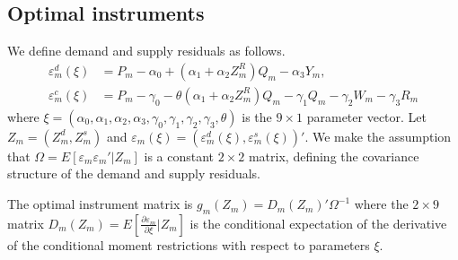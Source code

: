 \documentclass[11pt, a4paper]{article}
\begin{document}
\subsection{Optimal instruments}
We define demand and supply residuals as follows.
\begin{align*}
    \varepsilon^{d}_{m}(\xi) &= P_m - \alpha_0 + (\alpha_1 + \alpha_2Z^{R}_{m})Q_{m} - \alpha_3 Y_m,\\
    \varepsilon^c_m(\xi) &= P_{m} - \gamma_0 - \theta (\alpha_1 + \alpha_2 Z^{R}_m)Q_{m} - \gamma_1 Q_{m} - \gamma_2 W_m - \gamma_3 R_{m}
\end{align*}
where $\xi=\left(\alpha_0, \alpha_1, \alpha_2, \alpha_3, \gamma_0, \gamma_1, \gamma_2, \gamma_3, \theta\right)$ is the $9\times 1$ parameter vector. 
Let $Z_{m}=(Z_{m}^{d},Z_{m}^{s})$ and $\varepsilon_{m}(\xi)=(\varepsilon_{m}^{d}(\xi),\varepsilon_{m}^{s}(\xi))'$.
We make the assumption that $\Omega=E[\varepsilon_{m}\varepsilon_{m}'|Z_{m}]$ is a constant $2\times 2$ matrix, defining the covariance structure of the demand and supply residuals.
 
The optimal instrument matrix is $g_{m}(Z_{m})=D_{m}(Z_{m})'\Omega^{-1}$
where the $2\times 9$ matrix $D_{m}(Z_{m})=E\left[\frac{\partial \varepsilon_{m}}{\partial \xi}| Z_{m}\right]$ is the conditional expectation of the derivative of the conditional moment restrictions with respect to parameters $\xi$. 
\end{document}
